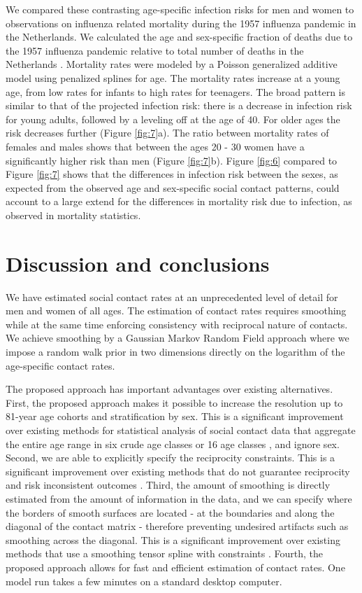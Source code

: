 \documentclass[aoas,preprint]{imsart}
\numberwithin{equation}{section}
\begin{document}
We compared these contrasting age-specific infection risks for men and women to observations on influenza related mortality during the 1957 influenza pandemic in the Netherlands. We calculated the age and sex-specific fraction of deaths due to the 1957 influenza pandemic relative to total number of deaths in the Netherlands \citep{polak_influenzasterfte_1959}. Mortality rates were modeled by a Poisson generalized additive model using penalized splines for age. The mortality rates increase at a young age, from low rates for infants to high rates for teenagers. The broad pattern is similar to that of the projected infection risk: there is a decrease in infection risk for young adults, followed by a leveling off at the age of 40. For older ages the risk decreases further (Figure \ref{fig:7}a). The ratio between mortality rates of females and males shows that between the ages 20 - 30 women have a significantly higher risk than men (Figure \ref{fig:7}b). Figure \ref{fig:6} compared to Figure \ref{fig:7} shows that the differences in infection risk between the sexes, as expected from the observed age and sex-specific social contact patterns, could account to a large extend for the differences in mortality risk due to infection, as observed in mortality statistics.

\section{Discussion and conclusions}

We have estimated social contact rates at an unprecedented level of detail for men and women of all ages. The estimation of contact rates requires smoothing while at the same time enforcing consistency with reciprocal nature of contacts. We achieve smoothing by a Gaussian Markov Random Field approach where we impose a random walk prior in two dimensions directly on the logarithm of the age-specific contact rates. 

The proposed approach has important advantages over existing alternatives. First, the proposed approach makes it possible to increase the resolution up to 81-year age cohorts and stratification by sex. This is a significant improvement over existing methods for statistical analysis of social contact data that aggregate the entire age range in six crude age classes \citep{wallinga_using_2006} or 16 age classes \citep{mossong_social_2008}, and ignore sex. Second, we are able to explicitly specify the reciprocity constraints. This is a significant improvement over existing methods that do not guarantee reciprocity and risk inconsistent outcomes \citep{mossong_social_2008}. Third, the amount of smoothing is directly estimated from the amount of information in the data, and we can specify where the borders of smooth surfaces are located - at the boundaries and along the diagonal of the contact matrix - therefore preventing undesired artifacts such as smoothing across the diagonal. This is a significant improvement over existing methods that use a smoothing tensor spline with constraints \citep{goeyvaerts_estimating_2010}. Fourth, the proposed approach allows for fast and efficient estimation of contact rates. One model run takes a few minutes on a standard desktop computer.
\end{document}

